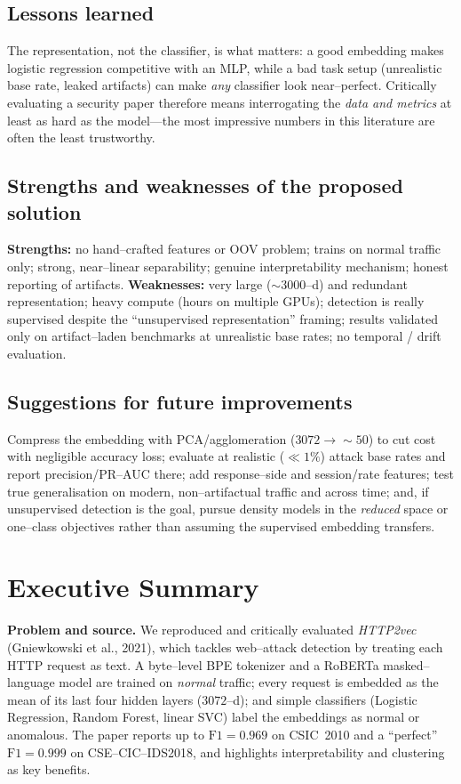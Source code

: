 \documentclass[11pt,a4paper]{article}
\begin{document}
\subsection{Lessons learned}
The representation, not the classifier, is what matters: a good embedding makes logistic
regression competitive with an MLP, while a bad task setup (unrealistic base rate, leaked
artifacts) can make \emph{any} classifier look near--perfect. Critically evaluating a
security paper therefore means interrogating the \emph{data and metrics} at least as hard
as the model---the most impressive numbers in this literature are often the least
trustworthy.

\subsection{Strengths and weaknesses of the proposed solution}
\textbf{Strengths:} no hand--crafted features or OOV problem; trains on normal traffic
only; strong, near--linear separability; genuine interpretability mechanism; honest
reporting of artifacts. \textbf{Weaknesses:} very large ($\sim$3000--d) and redundant
representation; heavy compute (hours on multiple GPUs); detection is really supervised
despite the ``unsupervised representation'' framing; results validated only on
artifact--laden benchmarks at unrealistic base rates; no temporal / drift evaluation.

\subsection{Suggestions for future improvements}
Compress the embedding with PCA/agglomeration ($3072\!\rightarrow\!\sim\!50$) to cut cost
with negligible accuracy loss; evaluate at realistic ($\ll1\%$) attack base rates and
report precision/PR--AUC there; add response--side and session/rate features; test true
generalisation on modern, non--artifactual traffic and across time; and, if unsupervised
detection is the goal, pursue density models in the \emph{reduced} space or one--class
objectives rather than assuming the supervised embedding transfers.

\section{Executive Summary}
\label{sec:exec}

\textbf{Problem and source.} We reproduced and critically evaluated \emph{HTTP2vec}
(Gniewkowski et al., 2021), which tackles web--attack detection by treating each HTTP
request as text. A byte--level BPE tokenizer and a RoBERTa masked--language model are
trained on \emph{normal} traffic; every request is embedded as the mean of its last four
hidden layers ($3072$--d); and simple classifiers (Logistic Regression, Random Forest,
linear SVC) label the embeddings as normal or anomalous. The paper reports up to
$\text{F1}=0.969$ on CSIC~2010 and a ``perfect'' $\text{F1}=0.999$ on CSE--CIC--IDS2018,
and highlights interpretability and clustering as key benefits.
\end{document}
